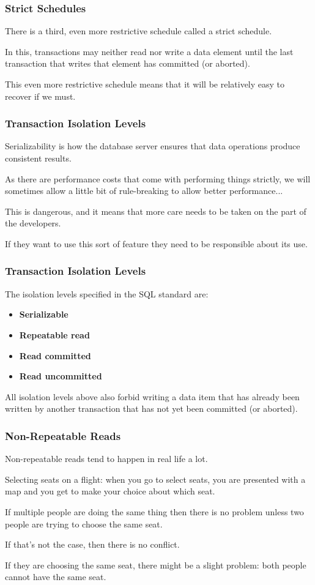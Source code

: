 \begin{frame}
\frametitle{Strict Schedules}

There is a third, even more restrictive schedule called a \alert{strict schedule}.

In this, transactions may neither read nor write a data element until the last transaction that writes that element has committed (or aborted).

This even more restrictive schedule means that it will be relatively easy to recover if we must.

\end{frame}

\begin{frame}
\frametitle{Transaction Isolation Levels}

Serializability is how the database server ensures that data operations produce consistent results. 

As there are performance costs that come with performing things strictly, we will sometimes allow a little bit of rule-breaking to allow better performance... 

This is dangerous, and it means that more care needs to be taken on the part of the developers. 

If they want to use this sort of feature they need to be responsible about its use.


\end{frame}

\begin{frame}
\frametitle{Transaction Isolation Levels}

The isolation levels specified in the SQL standard are:
\begin{itemize}
	\item \textbf{Serializable}
	\item \textbf{Repeatable read}
	\item \textbf{Read committed}
	\item \textbf{Read uncommitted}
\end{itemize}

All isolation levels above also forbid writing a data item that has already been written by another transaction that has not yet been committed (or aborted).

\end{frame}

\begin{frame}
\frametitle{Non-Repeatable Reads}

Non-repeatable reads tend to happen in real life a lot.

Selecting seats on a flight: when you go to select seats, you are presented with a map and you get to make your choice about which seat. 

If multiple people are doing the same thing then there is no problem unless two people are trying to choose the same seat. 

If that's not the case, then there is no conflict. 

If they are choosing the same seat, there might be a slight problem: both people cannot have the same seat.


\end{frame}

